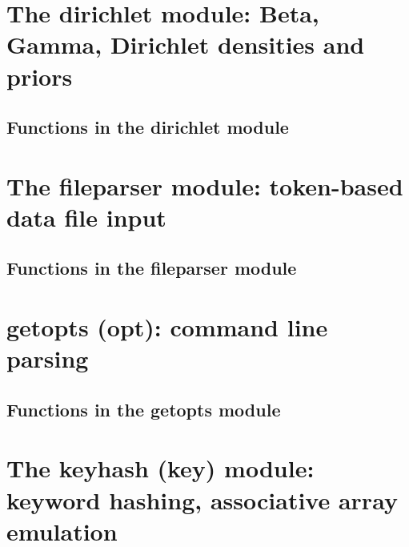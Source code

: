 \documentclass[11pt]{book}
\begin{document}
%



\newpage
\section{The dirichlet module: Beta, Gamma, Dirichlet densities and priors}

\subsection{Functions in the dirichlet module}






\newpage
\section{The fileparser module: token-based data file input}

\subsection{Functions in the fileparser module}




\newpage
\section{getopts (opt): command line parsing}

\subsection{Functions in the getopts module}


\newpage
\section{The keyhash (key) module: keyword hashing, associative array emulation}

\end{document}
